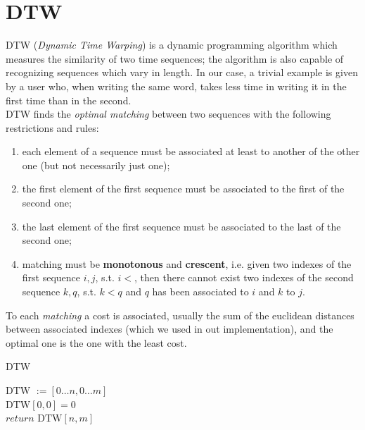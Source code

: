 \documentclass[8pt,notitlepage]{report}
\begin{document}
	\section{DTW}
		DTW (\textit{Dynamic Time Warping}) is a dynamic programming algorithm which measures the similarity of two time sequences; the algorithm is also capable of recognizing sequences which vary in length. In our case, a trivial example is given by a user who, when writing the same word, takes less time in writing it in the first time than in the second. \\
		DTW finds the \textit{optimal matching} between two sequences with the following restrictions and rules:
		\begin{enumerate}
			\item each element of a sequence must be associated at least to another of the other one (but not necessarily just one);
			\item the first element of the first sequence must be associated to the first of the second one;
			\item the last element of the first sequence must be associated to the last of the second one;
			\item matching must be \textbf{monotonous} and \textbf{crescent}, i.e. given two indexes of the first sequence $ i, j $, s.t. $ i < $, then there cannot exist two indexes of the second sequence $ k, q $, s.t. $ k < q $ and $ q $ has been associated to $ i $ and $ k $ to $ j $.
		\end{enumerate}
		To each \textit{matching} a cost is associated, usually the sum of the euclidean distances between associated indexes (which we used in out implementation), and the optimal one is the one with the least cost. 
		\begin{algorithm}[h]
			\SetAlgoLined
			\caption{DTW}
				$ \text{DTW } :=  [0 \dots n, 0 \dots m] $ \\
				$ \text{DTW}[0, 0] = 0 $ \\
				$ \textit{return } \text{DTW}[n, m] $
		\end{algorithm}
		
\end{document}

